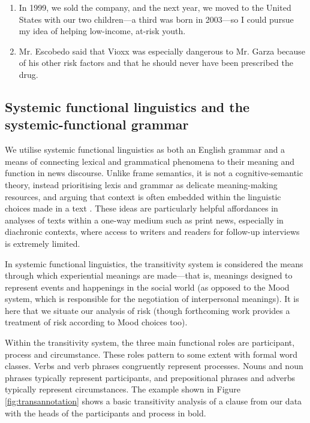 \begin{enumerate} [before=\color{black}\ttfamily] \setlength\itemsep{0em} \small
\item In 1999, we sold the company, and the next year, we moved to the United States with our two children---a third was born in 2003---so I could pursue my idea of helping low-income, at-risk youth. 
\item Mr. Escobedo said that Vioxx was especially dangerous to Mr. Garza because of his other risk factors and that he should never have been prescribed the drug.
\end{enumerate}

\subsection{Systemic functional linguistics and the systemic-functional grammar}

We utilise systemic functional linguistics as both an English grammar and a means of connecting lexical and grammatical phenomena to their meaning and function in news discourse. Unlike frame semantics, it is not a cognitive-semantic theory, instead prioritising lexis and grammar as delicate meaning-making resources, and arguing that context is often embedded within the linguistic choices made in a text \cite{eggins_introduction_2004}. These ideas are particularly helpful affordances in analyses of texts within a one-way medium such as print news, especially in diachronic contexts, where access to writers and readers for follow-up interviews is extremely limited.

In systemic functional linguistics, the transitivity system is considered the means through which experiential meanings are made---that is, meanings designed to represent events and happenings in the social world (as opposed to the Mood system, which is responsible for the negotiation of interpersonal meanings). It is here that we situate our analysis of risk (though forthcoming work provides a treatment of risk according to Mood choices too).

Within the transitivity system, the three main functional roles are participant, process and circumstance. These roles pattern to some extent with formal word classes. Verbs and verb phrases congruently represent processes. Nouns and noun phrases typically represent participants, and prepositional phrases and adverbs typically represent circumstances. The example shown in Figure \ref{fig:transannotation} shows a basic transitivity analysis of a clause from our data with the heads of the participants and process in bold.


